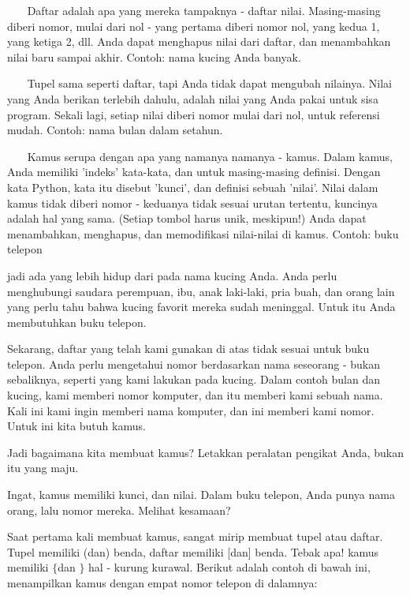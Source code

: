 \vspace{12pt}
~~~ Daftar adalah apa yang mereka tampaknya - daftar nilai. Masing-masing diberi nomor, mulai dari nol - yang pertama diberi nomor nol, yang kedua 1, yang ketiga 2, dll. Anda dapat menghapus nilai dari daftar, dan menambahkan nilai baru sampai akhir. Contoh: nama kucing Anda banyak. \par
~~~ Tupel sama seperti daftar, tapi Anda tidak dapat mengubah nilainya. Nilai yang Anda berikan terlebih dahulu, adalah nilai yang Anda pakai untuk sisa program. Sekali lagi, setiap nilai diberi nomor mulai dari nol, untuk referensi mudah. Contoh: nama bulan dalam setahun. \par
~~~ Kamus serupa dengan apa yang namanya namanya - kamus. Dalam kamus, Anda memiliki 'indeks' kata-kata, dan untuk masing-masing definisi. Dengan kata Python, kata itu disebut 'kunci', dan definisi sebuah 'nilai'. Nilai dalam kamus tidak diberi nomor - keduanya tidak sesuai urutan tertentu, kuncinya adalah hal yang sama. (Setiap tombol harus unik, meskipun!) Anda dapat menambahkan, menghapus, dan memodifikasi nilai-nilai di kamus. Contoh: buku telepon \par
jadi ada yang lebih hidup dari pada nama kucing Anda. Anda perlu menghubungi saudara perempuan, ibu, anak laki-laki, pria buah, dan orang lain yang perlu tahu bahwa kucing favorit mereka sudah meninggal. Untuk itu Anda membutuhkan buku telepon. \par
\vspace{12pt}
Sekarang, daftar yang telah kami gunakan di atas tidak sesuai untuk buku telepon. Anda perlu mengetahui nomor berdasarkan nama seseorang - bukan sebaliknya, seperti yang kami lakukan pada kucing. Dalam contoh bulan dan kucing, kami memberi nomor komputer, dan itu memberi kami sebuah nama. Kali ini kami ingin memberi nama komputer, dan ini memberi kami nomor. Untuk ini kita butuh kamus. \par
\vspace{12pt}
Jadi bagaimana kita membuat kamus? Letakkan peralatan pengikat Anda, bukan itu yang maju. \par
\vspace{12pt}
Ingat, kamus memiliki kunci, dan nilai. Dalam buku telepon, Anda punya nama orang, lalu nomor mereka. Melihat kesamaan? \par
\vspace{12pt}
Saat pertama kali membuat kamus, sangat mirip membuat tupel atau daftar. Tupel memiliki (dan) benda, daftar memiliki [dan] benda. Tebak apa! kamus memiliki  $  \{  $dan $  \}  $ hal - kurung kurawal. Berikut adalah contoh di bawah ini, menampilkan kamus dengan empat nomor telepon di dalamnya: \par
